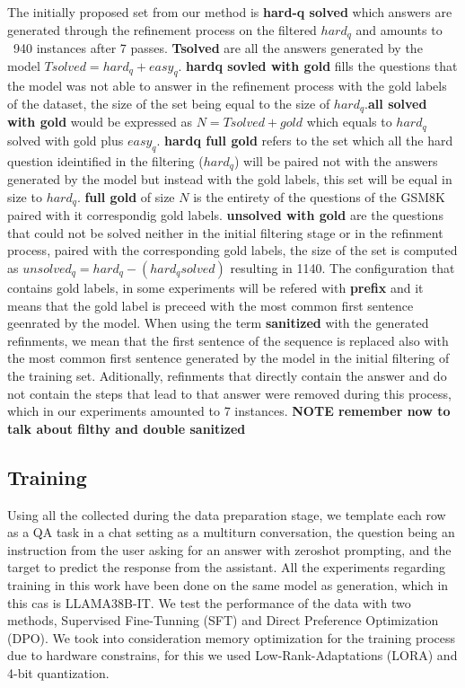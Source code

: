 \documentclass[a4paper,10pt]{article}
\begin{document}
The initially proposed set from our method is \textbf{hard-q solved} which answers are generated through the refinement process on the filtered $hard_q$ and amounts to ~940 instances after 7 passes. \textbf{Tsolved} are all the answers generated by the model $Tsolved = hard_q + easy_q$.  \textbf{hardq sovled with gold} fills the questions that the model was not able to answer in the refinement process with the gold labels of the dataset, the size of the set being equal to the size of $hard_q$.\textbf{all solved with gold} would be expressed as $N = Tsolved + gold$ which equals to $hard_q$ solved with gold plus $easy_q$. \textbf{hardq full gold} refers to the set which all the hard question ideintified in the filtering ($hard_q$) will be paired not with the answers generated by the model but instead with the gold labels, this set will be equal in size to $hard_q$. \textbf{full gold} of size $N$ is the entirety of the questions of the GSM8K paired with it correspondig gold labels. \textbf{unsolved with gold} are the questions that could not be solved neither in the initial filtering stage or in the refinment process, paired with the corresponding gold labels, the size of the set is computed as $unsolved_q = hard_q - (hard_q solved)$ resulting in 1140. The configuration that contains gold labels, in some experiments will be refered with \textbf{prefix} and it means that the gold label is preceed with the most common first sentence geenrated by the model. When using the term \textbf{sanitized} with the generated refinments, we mean that the first sentence of the sequence is replaced also with the most common first sentence generated by the model in the initial filtering of the training set. Aditionally, refinments that directly contain the answer and do not contain the steps that lead to that answer were removed during this process, which in our experiments amounted to 7 instances. \textbf{NOTE remember now to talk about filthy and double sanitized}
\subsection{Training}
Using all the collected during the data preparation stage, we template each row as a QA task in a chat setting as a multiturn conversation, the question being an instruction from the user asking for an answer with zeroshot prompting, and the target to predict the response from the assistant. All the experiments regarding training in this work have been done on the same model as generation, which in this cas is LLAMA38B-IT. We test the performance of the data with two methods, Supervised Fine-Tunning (SFT) and Direct Preference Optimization (DPO). We took into consideration memory optimization for the training process due to hardware constrains, for this we used Low-Rank-Adaptations (LORA) and 4-bit quantization.
\end{document}

